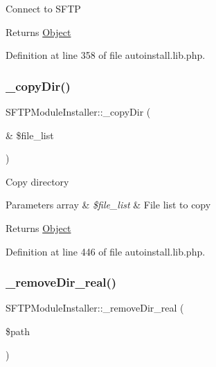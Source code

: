 Connect to S\+F\+TP

\begin{DoxyReturn}{Returns}
\hyperlink{classObject}{Object} 
\end{DoxyReturn}


Definition at line 358 of file autoinstall.\+lib.\+php.

\mbox{\label{classSFTPModuleInstaller_a57832797085ca931efd64c1080186e49}} 
\subsubsection{\texorpdfstring{\+\_\+copy\+Dir()}{\_copyDir()}}
{\footnotesize\ttfamily S\+F\+T\+P\+Module\+Installer\+::\+\_\+copy\+Dir (\begin{DoxyParamCaption}\item[{\&}]{\$file\+\_\+list }\end{DoxyParamCaption})}

Copy directory


\begin{DoxyParams}[1]{Parameters}
array & {\em \$file\+\_\+list} & File list to copy \\
\hline
\end{DoxyParams}
\begin{DoxyReturn}{Returns}
\hyperlink{classObject}{Object} 
\end{DoxyReturn}


Definition at line 446 of file autoinstall.\+lib.\+php.

\mbox{\label{classSFTPModuleInstaller_a2acd47768689f3b71562bfc5f53ea888}} 
\subsubsection{\texorpdfstring{\+\_\+remove\+Dir\+\_\+real()}{\_removeDir\_real()}}
{\footnotesize\ttfamily S\+F\+T\+P\+Module\+Installer\+::\+\_\+remove\+Dir\+\_\+real (\begin{DoxyParamCaption}\item[{}]{\$path }\end{DoxyParamCaption})}

